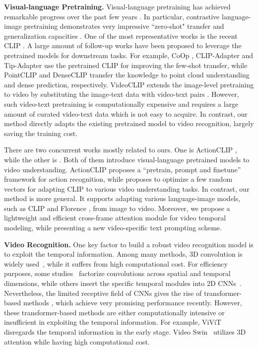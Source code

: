 \documentclass[runningheads]{llncs}
\begin{document}
\textbf{Visual-language Pretraining.} Visual-language pretraining has achieved remarkable progress over the past few years \cite{sun2019videobert,sun2019learning,miech2019howto100m,zhu2020actbert}.
In particular, contrastive language-image pretraining demonstrates very impressive ``zero-shot" transfer and generalization capacities \cite{clip,align,florence}. One of the most representative works is the recent CLIP \cite{clip}. A large amount of follow-up works have been proposed to leverage the pretrained models for downstream tasks. For example, CoOp \cite{zhou2021coop}, CLIP-Adapter \cite{gao2021clipadapter} and Tip-Adapter \cite{zhang2021tip} use the pretrained CLIP for improving the few-shot transfer, while PointCLIP \cite{zhang2021pointclip} and DenseCLIP \cite{rao2021denseclip,zhou2021denseclip} transfer the knowledge to point cloud understanding and dense prediction, respectively. VideoCLIP \cite{xu2021videoclip} extends the image-level pretraining to video by substituting the image-text data with video-text pairs \cite{miech2019howto100m}. However, such video-text pretraining is computationally expensive and requires a large amount of curated video-text data which is not easy to acquire. In contrast, our method directly adapts the existing pretrained model to video recognition, largely saving the training cost.


There are two concurrent works mostly related to ours. One is ActionCLIP \cite{wang2021actionclip}, while the other is \cite{ju2021prompting}. Both of them introduce visual-language pretrained models to video understanding. ActionCLIP proposes a ``pretrain, prompt and finetune'' framework for action recognition, 
while \cite{ju2021prompting} proposes to optimize a few random vectors for adapting CLIP to various video understanding tasks. In contrast, our method is more general. It supports adapting various language-image models, such as CLIP and Florence \cite{florence}, from image to video. Moreover, we propose a lightweight and efficient cross-frame attention module for video temporal modeling, while presenting a new video-specific text prompting scheme.

\textbf{Video Recognition.} One key factor to build a robust video recognition model is to exploit the temporal information. Among many methods, 3D convolution is widely used~\cite{tran2015learning,tran2018closer,qiu2017P3D,xie2018rethinking}, while it suffers from high computational cost. For efficiency purposes, some studies~\cite{tran2018closer,qiu2017P3D,xie2018rethinking} factorize convolutions across spatial and temporal dimensions, while others insert the specific temporal modules into 2D 
CNNs~\cite{lin2019tsm,li2020tea,liu2021tam}. Nevertheless, the limited receptive field of CNNs gives the rise of transformer-based methods \cite{arnab2021vivit,timesformer2021,liu2021video,Fan_2021_ICCV,yan2022multiview}, which achieve very promising performance recently. However, these transformer-based methods are either computationally intensive or insufficient in exploiting the temporal information. For example, ViViT~\cite{arnab2021vivit} disregards the temporal information in the early stage. Video Swin~\cite{liu2021video} utilizes 3D attention while having high computational cost. 
\end{document}
